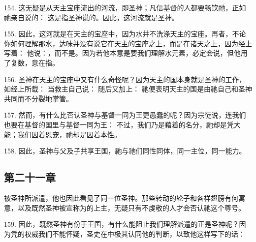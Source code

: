 154. 这无疑是从天主宝座流出的河流，即圣神；凡信基督的人都要畅饮祂，正如祂亲自说的： 这是指圣神说的。因此，这河流就是圣神。\par

155. 因此，这河就是在天主的宝座中，因为水并不洗涤天主的宝座。再者，不论你如何理解那水，达味并没有说它在天主的宝座之上，而是在诸天之上，因为经上写着： 他说：，而不是。因为若他本意是要我们理解水元素，必定会说，但他用了复数，意在指。\par

156. 圣神在天主的宝座中又有什么奇怪呢？因为天主的国本身就是圣神的工作，如经上所载： 当救主自己说： 随后又加上： 祂便表明天主的国是由祂自己和圣神共同而不分裂地掌管。\par

157. 然而，有什么比否认圣神与基督一同为王更愚蠢的呢？因为宗徒说，连我们也要在基督的国里与基督一同为王： 不过，我们乃是藉着的名分，祂却是凭大能；我们因着恩宠，祂却是因着本性。\par

158. 因此，圣神与父及子共享王国，祂与祂们同性同体，同一主位，同一能力。\par


\subsection{第二十一章}

被圣神所派遣，他也因此看见了同一位圣神。那些转动的轮子和各样翅膀有何寓意，以及既然圣神被宣称为的上主，无疑只有不虔敬的人才会否认祂这个尊号。\par

159. 因此，既然圣神有份于王国，有什么能阻止我们理解派遣的正是圣神呢？因为凭的权威我们不能怀疑，圣史在中极其认同他的判断，以致他这样写下的话：\par

